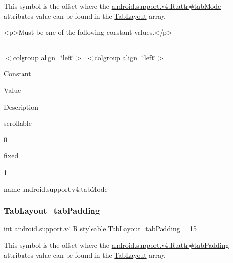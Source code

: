 This symbol is the offset where the \hyperlink{classandroid_1_1support_1_1v4_1_1R_1_1attr_a3e4b1597143989d6562d2c5319323044}{android.\+support.\+v4.\+R.\+attr\#tab\+Mode} attribute\textquotesingle{}s value can be found in the \hyperlink{classandroid_1_1support_1_1v4_1_1R_1_1styleable_a48e866d7121b40ef0bb3d467759606a9}{Tab\+Layout} array.

\begin{DoxyVerb}      <p>Must be one of the following constant values.</p>
\end{DoxyVerb}
 \tabulinesep=1mm
\begin{longtabu} spread 0pt [c]{*{0}{|X[-1]}|}
\hline
\end{longtabu}
$<$colgroup align=\char`\"{}left\char`\"{}$>$ $<$colgroup align=\char`\"{}left\char`\"{}$>$ 

Constant

Value

Description 

{\ttfamily scrollable}

0

{\ttfamily fixed}

1

name android.\+support.\+v4\+:tab\+Mode \mbox{\label{classandroid_1_1support_1_1v4_1_1R_1_1styleable_ad20356f6d901f463b8d5baf3875311a0}} 
\subsubsection{\texorpdfstring{Tab\+Layout\+\_\+tab\+Padding}{TabLayout\_tabPadding}}
{\footnotesize\ttfamily int android.\+support.\+v4.\+R.\+styleable.\+Tab\+Layout\+\_\+tab\+Padding = 15\hspace{0.3cm}{\ttfamily [static]}}

This symbol is the offset where the \hyperlink{classandroid_1_1support_1_1v4_1_1R_1_1attr_a70e00cd44bcb59cc8adb7ddc6003d584}{android.\+support.\+v4.\+R.\+attr\#tab\+Padding} attribute\textquotesingle{}s value can be found in the \hyperlink{classandroid_1_1support_1_1v4_1_1R_1_1styleable_a48e866d7121b40ef0bb3d467759606a9}{Tab\+Layout} array.

